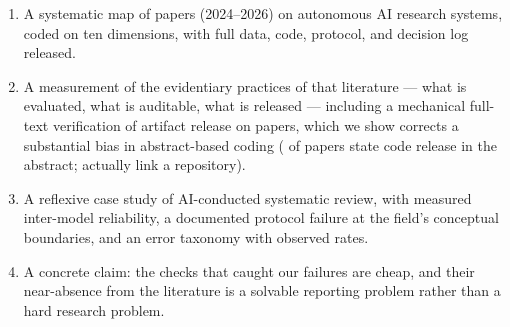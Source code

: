 \begin{enumerate}\itemsep2pt
\item A systematic map of \nCorpus{} papers (2024--2026) on autonomous AI research systems,
coded on ten dimensions, with full data, code, protocol, and decision log released.
\item A measurement of the evidentiary practices of that literature --- what is evaluated,
what is auditable, what is released --- including a mechanical full-text verification of
artifact release on \nArtChecked{} papers, which we show corrects a substantial bias in
abstract-based coding (\pctRepoAbstract{} of papers state code release in the abstract;
\pctRepo{} actually link a repository).
\item A reflexive case study of AI-conducted systematic review, with measured inter-model
reliability, a documented protocol failure at the field's conceptual boundaries, and an
error taxonomy with observed rates.
\item A concrete claim: the checks that caught our failures are cheap, and their near-absence
from the literature is a solvable reporting problem rather than a hard research problem.
\end{enumerate}
